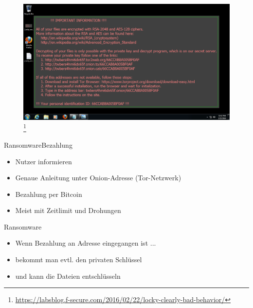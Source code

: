 \documentclass[10pt]{beamer}
\begin{document}
\begin{frame}[plain]
	\begin{figure}[p]
		\centering
		\includegraphics[scale=0.30]{locky-recover-instructions.png}
		\let\thefootnote\relax\footnote{\url{https://labsblog.f-secure.com/2016/02/22/locky-clearly-bad-behavior/}}
	\end{figure}
\end{frame}

\begin{frame}{Ransomware}{Bezahlung}
	\begin{itemize}
		\item Nutzer informieren
		\item Genaue Anleitung unter Onion-Adresse (Tor-Netzwerk)
		\item Bezahlung per Bitcoin
		\item Meist mit Zeitlimit und Drohungen
	\end{itemize}
\end{frame}


\begin{frame}{Ransomware}
	\begin{itemize}
		\item Wenn Bezahlung an Adresse eingegangen ist ...
		\item bekommt man evtl. den privaten Schlüssel
		\item und kann die Dateien entschlüsseln
	\end{itemize}
\end{frame}
\end{document}
